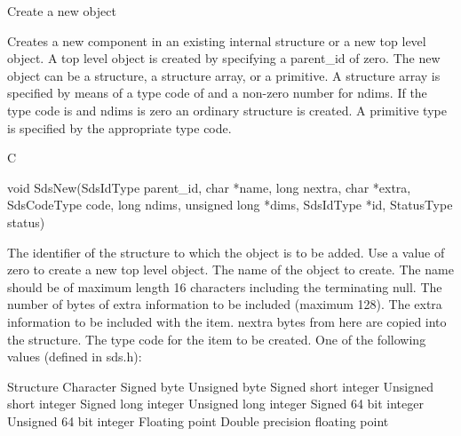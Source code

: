 \begin{manroutinedescription}
      Create a new object

      Creates a new component in an existing internal structure or a
      new top level object. A top level object is created by specifying
      a parent\_{}id of zero. The new object can be a structure, a structure
      array, or a primitive. A structure array is specified by means of a
      type code of {} and a non-zero number for ndims. If %
the type
      code is {} and ndims is zero an ordinary structure %
is created.
      A primitive type is specified by the appropriate type code.
 
      C

      void SdsNew(SdsIdType parent\_{}id, char *name, long nextra, char *extra,
         SdsCodeType code, long ndims, unsigned long *dims, SdsIdType *id,
         StatusType {\mantt{*}} {} status)
 
\begin{manparametertable}
 The identifier of the %
structure to
                            which the object is to be added. Use a
                            value of zero to create a new top level object.
 The name of the object to create.
                            The name should be of maximum length 16
                            characters including the terminating null.
  The number of bytes of extra %
information to
                            be included (maximum 128).
 The extra information to be %
included with the item.
                            nextra bytes from here are copied into the
                            structure.
 The type code for the item %
to be created. One of
                            the following values (defined in sds.h):
\end{manparametertable}
\begin{mantwocolumntable}
Structure
Character
Signed byte
Unsigned byte
Signed short integer
Unsigned short integer
Signed long integer
Unsigned long integer
Signed 64 bit integer
Unsigned 64 bit integer
Floating point
Double precision floating point
 

\end{mantwocolumntable}
\end{manroutinedescription}
